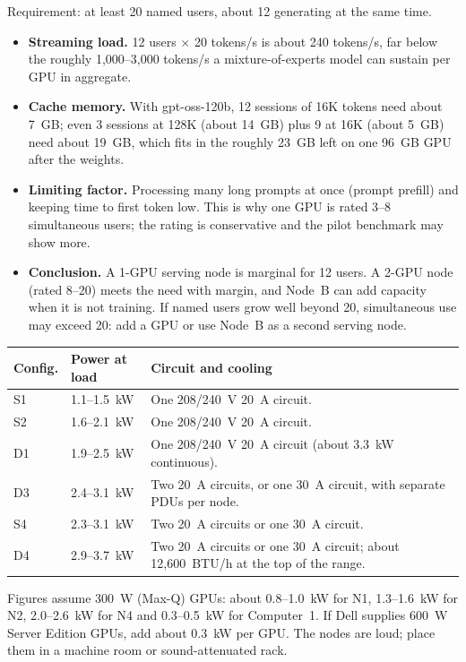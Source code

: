 Requirement: at least 20 named users, about 12 generating at the same time.
\begin{itemize}
  \item \textbf{Streaming load.} 12 users $\times$ 20 tokens/s is about 240 tokens/s,
    far below the roughly 1,000--3,000 tokens/s a mixture-of-experts model can sustain per
    GPU in aggregate.
  \item \textbf{Cache memory.} With gpt-oss-120b, 12 sessions of 16K tokens need about 7~GB;
    even 3 sessions at 128K (about 14~GB) plus 9 at 16K (about 5~GB) need about 19~GB, which
    fits in the roughly 23~GB left on one 96~GB GPU after the weights.
  \item \textbf{Limiting factor.} Processing many long prompts at once (prompt prefill) and
    keeping time to first token low. This is why one GPU is rated 3--8 simultaneous users;
    the rating is conservative and the pilot benchmark may show more.
  \item \textbf{Conclusion.} A 1-GPU serving node is marginal for 12 users. A 2-GPU node
    (rated 8--20) meets the need with margin, and Node~B can add capacity when it is not
    training. If named users grow well beyond 20, simultaneous use may exceed 20: add a GPU
    or use Node~B as a second serving node.
\end{itemize}


{\small
\begin{tabularx}{\textwidth}{@{}l Y{0.6} Y{1.4}@{}}
  \toprule
  Config. & Power at load & Circuit and cooling \\
  \midrule
  S1 & 1.1--1.5~kW & One 208/240~V 20~A circuit. \\
  S2 & 1.6--2.1~kW & One 208/240~V 20~A circuit. \\
  D1 & 1.9--2.5~kW & One 208/240~V 20~A circuit (about 3.3~kW continuous). \\
  D3 & 2.4--3.1~kW & Two 20~A circuits, or one 30~A circuit, with separate PDUs per node. \\
  S4 & 2.3--3.1~kW & Two 20~A circuits or one 30~A circuit. \\
  D4 & 2.9--3.7~kW & Two 20~A circuits or one 30~A circuit; about 12,600~BTU/h at the top of the range. \\
  \bottomrule
\end{tabularx}}

Figures assume 300~W (Max-Q) GPUs: about 0.8--1.0~kW for N1, 1.3--1.6~kW for N2,
2.0--2.6~kW for N4 and 0.3--0.5~kW for Computer~1. If Dell supplies 600~W Server
Edition GPUs, add about 0.3~kW per GPU. The nodes are loud; place them
in a machine room or sound-attenuated rack.

